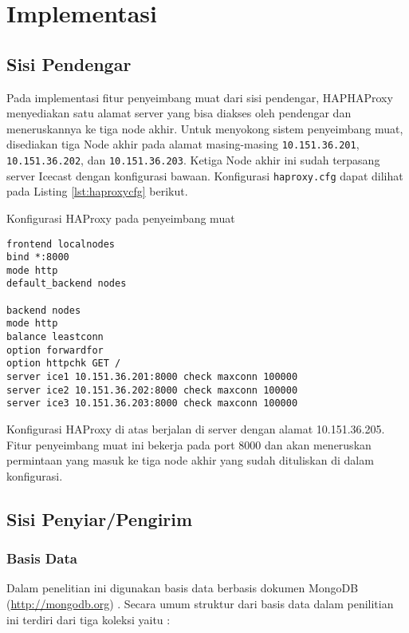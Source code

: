 \chapter{Implementasi}


\section{Sisi Pendengar}
Pada implementasi fitur penyeimbang muat dari sisi pendengar, HAPHAProxy menyediakan satu alamat server yang bisa diakses oleh pendengar dan meneruskannya ke tiga node akhir. Untuk menyokong sistem penyeimbang muat, disediakan tiga Node akhir pada alamat masing-masing \texttt{10.151.36.201}, \texttt{10.151.36.202}, dan \texttt{10.151.36.203}. Ketiga Node akhir ini sudah terpasang server Icecast dengan konfigurasi bawaan. Konfigurasi \texttt{haproxy.cfg} dapat dilihat pada Listing \ref{lst:haproxycfg} berikut.


\begin{listing}
\label{lst:haproxycfg}
\caption{Konfigurasi HAProxy pada penyeimbang muat}
\begin{lstlisting}[breaklines,frame=single]
frontend localnodes
bind *:8000
mode http
default_backend nodes

backend nodes
mode http
balance leastconn
option forwardfor
option httpchk GET /
server ice1 10.151.36.201:8000 check maxconn 100000
server ice2 10.151.36.202:8000 check maxconn 100000
server ice3 10.151.36.203:8000 check maxconn 100000

\end{lstlisting}
\end{listing}

Konfigurasi HAProxy di atas berjalan di server dengan alamat 10.151.36.205. Fitur penyeimbang muat ini bekerja pada port 8000 dan akan meneruskan permintaan yang masuk ke tiga node akhir yang sudah dituliskan di dalam konfigurasi. 
\section{Sisi Penyiar/Pengirim}

\subsection{Basis Data}
Dalam penelitian ini digunakan basis data berbasis dokumen MongoDB (\url{http://mongodb.org}) . Secara umum struktur dari basis data dalam penilitian ini terdiri dari tiga koleksi yaitu :

